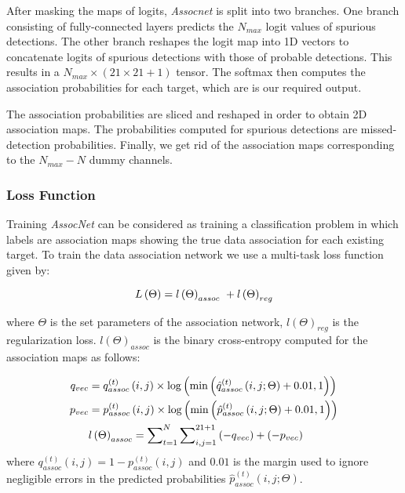 \documentclass[letterpaper, 10 pt, conference]{ieeeconf}
\begin{document}
\par After masking the maps of logits, \textit{Assocnet} is split into two branches. One branch consisting of fully-connected layers predicts the $N_{max}$ logit values of spurious detections. The other branch reshapes the logit map into 1D vectors to concatenate logits of spurious detections with those of probable detections. This results in a $N_{max}\times(21\times21+1)$ tensor. The softmax then computes the association probabilities for each target, which are is our required output.
\par The association probabilities are sliced and reshaped in order to obtain 2D association maps. The probabilities computed for spurious detections are missed-detection probabilities. Finally, we get rid of the association maps  corresponding to the $N_{max} - N$ dummy channels.

\subsubsection{Loss Function}
Training \textit{AssocNet} can be considered as training a classification problem in which labels are association maps showing the true data association for each existing target. To train the data association network we use a multi-task loss function given by:

\begin{equation}{\label{eq:4}}
L\left({\Theta} \right) = l\left( {\Theta} \right)_{assoc} \ + l\left( {\Theta} \right)_{reg}
\end{equation}

\noindent
where ${\Theta}$ is the set parameters of the association network, $l\left( {\Theta} \right)_{reg}$ is the regularization loss. $l\left( {\Theta} \right)_{assoc}$ is the binary cross-entropy computed for the association maps as follows:

\begin{equation} {\label{eq:5}}
\begin{split}
 q_{vec} &= q_{assoc}^{\left( t \right)} \left( {i,j} \right) \times  \log  \left( {\min \left( {\hat q_{assoc}^{\left( t \right)}\left( {i,j; {\Theta}} \right) + 0.01,1} \right)} \right) 
\\
p_{vec} &= p_{assoc}^{\left( t \right)} \left( {i,j} \right) \times  \log \left( {\min \left( {\hat p_{assoc}^{\left( t \right)} \left( {i,j; {\Theta}} \right)  + 0.01,1} \right)} \right) 
\\ 
 & l\left( {\Theta} \right)_{assoc} =  \sum\nolimits_{t = 1}^{N} \sum\nolimits_{i,j = 1}^{21 + 1} \left( - q_{vec} \right)  + 
  \left(- p_{vec}  \right)
\end{split}
\end{equation}
\noindent
where $ q_{assoc}^{\left( t \right)} \left( {i,j} \right)  = 1 - p_{assoc}^{\left( t \right)}\left( {i,j} \right)$ and $0.01$ is the margin used to ignore negligible  errors  in the predicted probabilities $\hat p_{assoc}^{\left( t \right)}\left( {i,j; {\Theta }} \right)$.
\end{document}
